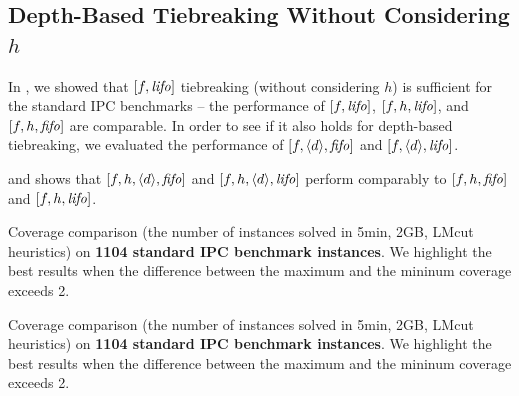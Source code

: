 \subsection{Depth-Based Tiebreaking Without Considering $h$}

In , we showed that $[f,{\mbox{\textit{lifo}}}]$ tiebreaking
(without considering $h$) is sufficient for the standard IPC benchmarks
-- the performance of $[f,{\mbox{\textit{lifo}}}]$, $[f,h,{\mbox{\textit{lifo}}}]$, and $[f,h,{\mbox{\textit{fifo}}}]$ are
comparable.  In order to see if it also holds for depth-based
tiebreaking, we evaluated the performance of $[f,{\left<d\right>},{\mbox{\textit{fifo}}}]$
and $[f,{\left<d\right>},{\mbox{\textit{lifo}}}]$.

 and 
 shows that
 $[f,h,{\left<d\right>},{\mbox{\textit{fifo}}}]$ and  $[f,h,{\left<d\right>},{\mbox{\textit{lifo}}}]$
 perform comparably to $[f,h,{\mbox{\textit{fifo}}}]$ and $[f,h,{\mbox{\textit{lifo}}}]$.


\begin{table}[htbp]
 {
 \centering
 
 \caption{
 Coverage comparison (the number of instances solved in 5min, 2GB, LMcut
 heuristics) on \textbf{1104 standard IPC benchmark instances}. We highlight the
 best results when the difference between the maximum and the mininum coverage exceeds 2.
 }
 \label{tbl:lmcut-ipc-noh}
 }
\end{table}
\begin{table}[htbp]
 {
 \centering
 
 \caption{
 Coverage comparison (the number of instances solved in 5min, 2GB, LMcut
 heuristics) on \textbf{1104 standard IPC benchmark instances}. We highlight the
 best results when the difference between the maximum and the mininum coverage exceeds 2.
 }
 \label{tbl:mands-ipc-noh}
 }
\end{table}





